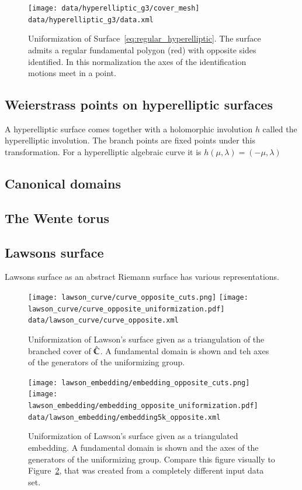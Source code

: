\documentclass[Thesis.tex]{subfiles}
\begin{document}
\begin{figure}
\centering
\texttt{[image: data/hyperelliptic\_g3/cover\_mesh]}
{\scriptsize\tt data/hyperelliptic\_g3/data.xml}
\caption{Uniformization of Surface~\ref{eq:regular_hyperelliptic}. The surface admits
a regular fundamental polygon (red) with opposite sides identified. In this normalization
the axes of the identification motions meet in a point.}
\label{fig:regular_cover}
\end{figure}


\subsection{Weierstrass points on hyperelliptic surfaces}
A hyperelliptic surface comes together with a holomorphic involution $h$ called the hyperelliptic involution. The branch points are fixed points under this transformation. For a hyperelliptic algebraic curve it is $h(\mu, \lambda)=(-\mu, \lambda)$

\subsection{Canonical domains}
\subsection{The Wente torus}
\subsection{Lawsons surface}

Lawsons surface as an abstract Riemann surface has various representations. 

\begin{figure}
	\centering
	\texttt{[image: lawson\_curve/curve\_opposite\_cuts.png]}
	\texttt{[image: lawson\_curve/curve\_opposite\_uniformization.pdf]}
	{\scriptsize\tt data/lawson\_curve/curve\_opposite.xml}
	\caption{Uniformization of Lawson's surface given as a triangulation
of the branched cover of $\hat{\mathbb C}$. A fundamental domain is shown and
teh axes of the generators of the uniformizing group.}
	\label{fig:lawson_curve_opposite}
\end{figure}


\begin{figure}
	\centering
	\texttt{[image: lawson\_embedding/embedding\_opposite\_cuts.png]}
	\texttt{[image: lawson\_embedding/embedding\_opposite\_uniformization.pdf]}
	{\scriptsize\tt data/lawson\_embedding/embedding5k\_opposite.xml}
	\caption{Uniformization of Lawson's surface given as a triangulated embedding. A fundamental domain is shown and the axes of the generators of the uniformizing group. Compare this figure visually to Figure~\ref{fig:lawson_curve_opposite}, that was created 
from a completely different input data set.}
	\label{fig:lawson_embedding_opposite}
\end{figure}
\end{document}
